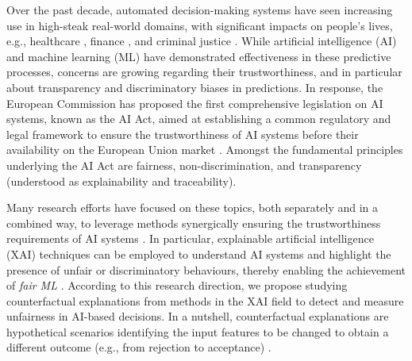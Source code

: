 \documentclass[letterpaper]{article} %
\begin{document}
Over the past decade, automated decision-making systems have seen increasing use in high-steak real-world domains, with significant impacts on people's lives, e.g., healthcare \cite{Morik10}, finance \cite{10.5555/573193}, and criminal justice \cite{angwin2016machine,DBLP:journals/corr/abs-1905-12728}. While artificial intelligence (AI) and machine learning (ML) have demonstrated effectiveness in these predictive processes, concerns are growing regarding their trustworthiness, and in particular about transparency and discriminatory biases in predictions.
%
In response, the European Commission has proposed the first comprehensive legislation on AI systems, known as the AI Act, aimed at establishing a common regulatory and legal framework to ensure the trustworthiness of AI systems before their availability on the European Union market \cite{europeancommission2021}. Amongst the fundamental principles underlying the AI Act are fairness, non-discrimination, and transparency (understood as explainability and traceability).

Many research efforts have focused on these topics, both separately and in a combined way, to leverage methods synergically ensuring the trustworthiness requirements of AI systems \cite{mucsanyi2023trustworthy}.
%
In particular, explainable artificial intelligence (XAI) techniques \cite{8466590} can be employed to understand AI systems and highlight the presence of unfair or discriminatory behaviours, thereby enabling the achievement of \textit{fair ML} \cite{10.1145/3616865}.
%
According to this research direction, we propose studying counterfactual explanations from methods in the XAI field to detect and measure unfairness in AI-based decisions. In a nutshell, counterfactual explanations are hypothetical scenarios identifying the input features to be changed to obtain a different outcome (e.g., from rejection to acceptance) \cite{guidotti2022counterfactual,10.1145/3527848}. 
\end{document}
